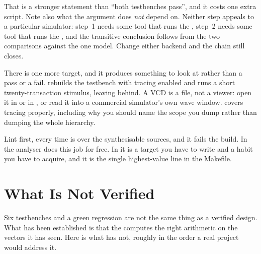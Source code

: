 That is a stronger statement than ``both testbenches pass'', and it costs one
extra script. Note also what the argument does \emph{not} depend on. Neither
step appeals to a particular simulator: step~1 needs some tool that runs the
\SV{}, step~2 needs some tool that runs the \VHDL{}, and the transitive
conclusion follows from the two comparisons against the one model. Change
either backend and the chain still closes.

There is one more target, and it produces something to look at rather than a
pass or a fail.  rebuilds the \SV{} testbench with tracing
enabled and runs a short twenty-transaction stimulus, leaving
 behind. A VCD is a file, not a viewer: open it in
 or in , or read it into a commercial simulator's
own wave window. \Refsimulationbook covers tracing properly, including why
you should name the scope you dump rather than dumping the whole hierarchy.

\begin{tipbox}{Lint first, every time}
 is  over the synthesisable
sources, and it fails the build. In \VHDL{} the analyser does this job for
free. In \SV{} it is a target you have to write and a habit you have to
acquire, and it is the single highest-value line in the Makefile.
\end{tipbox}

\clearpage
{}

\section{What Is Not Verified}
\label{sec:case:gaps}

Six testbenches and a green regression are not the same thing as a verified
design. What has been established is that the \RTL{} computes the right
arithmetic on the vectors it has seen. Here is what has not, roughly in the
order a real project would address it.


